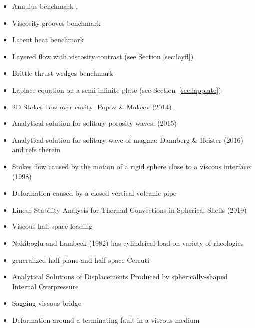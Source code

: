 \begin{itemize}
\item Annulus benchmark \cite{aspectmanual}, \cite{ples11}

\item Viscosity grooves benchmark \cite{aspectmanual}

\item Latent heat benchmark \cite{aspectmanual}

\item Layered flow with viscosity contrast \cite{aspectmanual} 
      (see Section \ref{sec:layfl}) 

\item Brittle thrust wedges benchmark \cite{busa16,aspectmanual}

\item Laplace equation on a semi infinite plate (see Section~\ref{sec:lapplate})

\item 2D Stokes flow over cavity: Popov \& Makeev (2014) \cite{poma14}.

\item Analytical solution for solitary porosity waves: \textcite{copo15} (2015)

\item Analytical solution for solitary wave of magma: Dannberg \& Heister (2016) \cite{dahe16} and refs therein

\item Stokes flow caused by the motion of a rigid sphere close 
      to a viscous interface: \textcite{dagr98} (1998)

\item Deformation caused by a closed vertical volcanic pipe \cite{boda99}

\item Linear Stability Analysis for Thermal Convections in 
      Spherical Shells \textcite{yuwa19} (2019)

\item Viscous half-space loading \cite{hask35}

\item Nakiboglu and Lambeck (1982) has cylindrical load on variety of rheologies \cite{nala82}

\item generalized half-plane and half-space Cerruti \cite{nowi92,zhga15}

\item Analytical Solutions of Displacements Produced by spherically-shaped Internal Overpressure \cite{gech12}

\item Sagging viscous bridge \cite{stokes98}

\item Deformation around a terminating fault in a viscous medium \cite{baho96}

\end{itemize}










